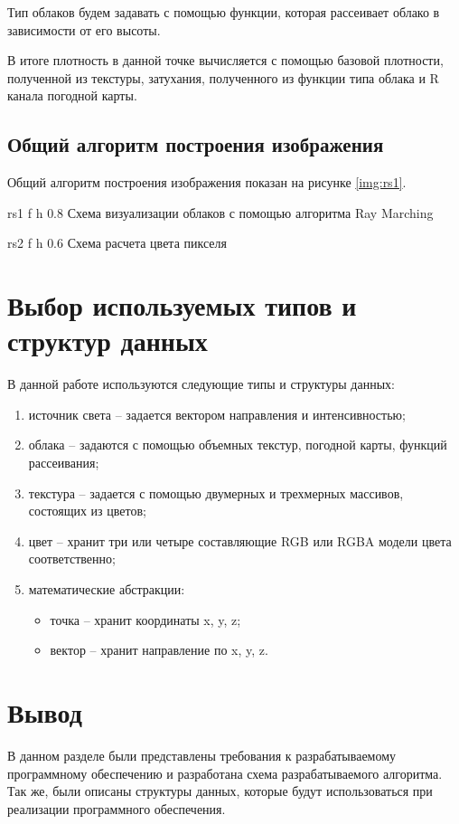 Тип облаков будем задавать с помощью функции, которая рассеивает облако в зависимости от его высоты. 

В итоге плотность в данной точке вычисляется с помощью базовой плотности, полученной из текстуры, затухания, полученного из функции типа облака и R канала погодной карты. 

\subsection{Общий алгоритм построения изображения}

Общий алгоритм построения изображения показан на рисунке \ref{img:rs1}.
\clearpage

{rs1} %
{f} %
{h} %
{0.8\textwidth} %
{Схема визуализации облаков с помощью алгоритма Ray Marching} %

{rs2} %
{f} %
{h} %
{0.6\textwidth} %
{Схема расчета цвета пикселя} %

\clearpage

\section{Выбор используемых типов и структур данных}

В данной работе используются следующие типы и структуры данных:
\begin{enumerate}
	\item источник света -- задается вектором направления и интенсивностью;
	\item облака -- задаются с помощью объемных текстур, погодной карты, функций рассеивания;
	\item текстура -- задается с помощью двумерных и трехмерных массивов, состоящих из цветов;
	\item цвет -- хранит три или четыре составляющие RGB или RGBA модели цвета соответственно;
	\item математические абстракции: 
		\begin{itemize}
			\item точка -- хранит координаты x, y, z;
			\item вектор -- хранит направление по x, y, z.
		\end{itemize}
\end{enumerate}


\section*{Вывод}
В данном разделе были представлены требования к разрабатываемому
программному обеспечению и разработана схема разрабатываемого алгоритма.
Так же, были описаны структуры данных, которые будут использоваться при реализации программного обеспечения.

